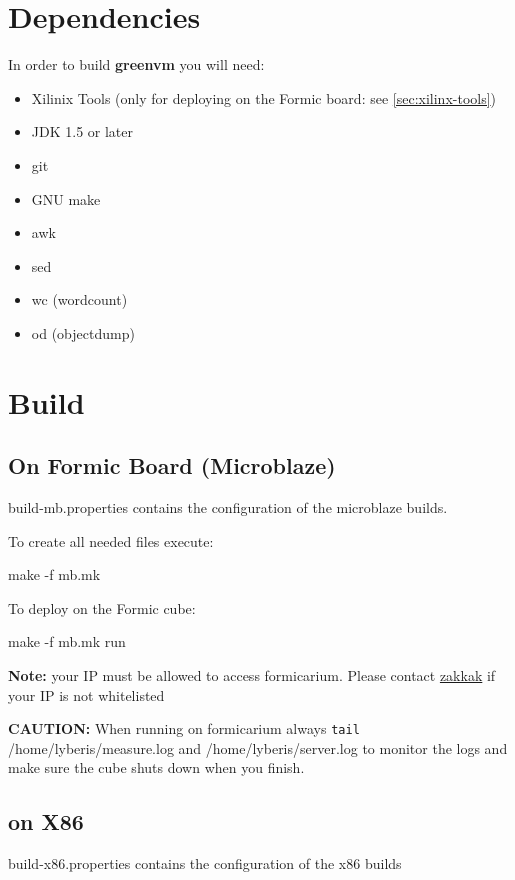 \documentclass[
a4paper,
12pt,
]{report}
\newcommand{\gvm}{{\fontfamily{fco}\selectfont\textbf{\color{g}green\color{v}vm}}\xspace}
\begin{document}
\section{Dependencies}

In order to build \gvm you will need:

\begin{itemize}
\item Xilinix Tools (only for deploying on the Formic board: see
  \autoref{sec:xilinx-tools})
\item JDK 1.5 or later
\item git
\item GNU make
\item awk
\item sed
\item wc (wordcount)
\item od (objectdump)
\end{itemize}

\section{Build}

\subsection{On Formic Board (Microblaze)}
build-mb.properties contains the configuration of the microblaze
builds.

To create all needed files execute:
\begin{bash}
make -f mb.mk
\end{bash}


To deploy on the Formic cube:
\begin{bash}
make -f mb.mk run
\end{bash}

\textbf{Note:} your IP must be allowed to access formicarium. Please
contact \href{mailto:zakkak@ics.forth.gr}{zakkak} if your IP is not
whitelisted

\textbf{\color{red}CAUTION:} When running on formicarium always
\verb!tail! /home/lyberis/measure.log and /home/lyberis/server.log to
monitor the logs and make sure the cube shuts down when you finish.

\subsection{on X86}
build-x86.properties contains the configuration of the x86 builds
\end{document}
